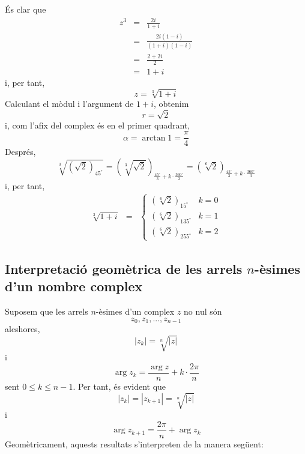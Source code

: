 \begin{solucio}
És clar que
\begin{eqnarray*}
z^{3} &=&\frac{2i}{1+i} \\
&=&\frac{2i(1-i)}{(1+i)(1-i)} \\
&=&\frac{2+2i}{2} \\
&=&1+i
\end{eqnarray*}
i, per tant,
\begin{equation*}
z=\sqrt[3]{1+i}
\end{equation*}
Calculant el mòdul i l’argument de $1+i$, obtenim
\begin{equation*}
r=\sqrt{2}
\end{equation*}
i, com l’afix del complex és en el primer quadrant,
\begin{equation*}
\alpha =\arctan 1=\frac{\pi }{4}
\end{equation*}
Després,
\begin{equation*}
\sqrt[3]{\left( \sqrt{2}\right) _{45
^{\circ}
}}=\left( \sqrt[3]{\sqrt{2}}\right) _{\frac{45
^{\circ}
}{3}+k\cdot \frac{360
^{\circ}
}{3}}=\left( \sqrt[6]{2}\right) _{\frac{45
^{\circ}
}{3}+k\cdot \frac{360
^{\circ}
}{3}}
\end{equation*}
i, per tant,
\begin{equation*}
\begin{array}{lll}
\sqrt[3]{1+i} & = & \left\{
\begin{array}{ll}
\left( \sqrt[6]{2}\right) _{15
^{\circ}
} & k=0 \\
\left( \sqrt[6]{2}\right) _{135
^{\circ}
} & k=1 \\
\left( \sqrt[6]{2}\right) _{255
^{\circ}
} & k=2
\end{array}
\right.
\end{array}
\end{equation*}
\end{solucio}

\subsection{Interpretació geomètrica de les arrels $n$-èsimes d’un nombre complex}

Suposem que les arrels $n$-èsimes d’un complex $z$ no nul són
\begin{equation*}
z_{0},z_{1},...,z_{n-1}
\end{equation*}
aleshores,
\begin{equation*}
\left\vert z_{k}\right\vert =\sqrt[n]{\left\vert z\right\vert }
\end{equation*}
i
\begin{equation*}
\arg z_{k}=\frac{\arg z}{n}+k\cdot \frac{2\pi }{n}
\end{equation*}
sent $0\leq k\leq n-1$. Per tant, és evident que
\begin{equation*}
\left\vert z_{k}\right\vert =\left\vert z_{k+1}\right\vert =\sqrt[n]{
\left\vert z\right\vert }
\end{equation*}
i
\begin{equation*}
\arg z_{k+1}=\frac{2\pi }{n}+\arg z_{k}
\end{equation*}
Geomètricament, aquests resultats s’interpreten de la manera següent:

